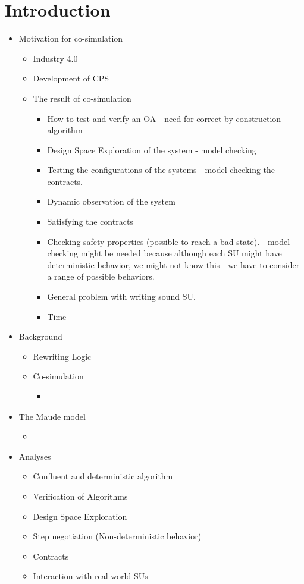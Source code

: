 \section{Introduction}\label{sc:introduction}
\begin{itemize}
    \item Motivation for co-simulation
    \begin{itemize}
      \item Industry 4.0
      \item Development of CPS
      \item The result of co-simulation
      \begin{itemize}
      \item How to test and verify an OA - need for correct by construction algorithm
      \item Design Space Exploration of the system - model checking 
      \item Testing the configurations of the systems - model checking the contracts.
      \item Dynamic observation of the system
      \item Satisfying the contracts
      \item Checking safety properties (possible to reach a bad state). - model checking might be needed because although each SU might have deterministic behavior, we might not know this - we have to consider a range of possible behaviors.
      \item General problem with writing sound SU.
      \item Time 
    \end{itemize}
    \end{itemize}
    \item Background
    \begin{itemize}
      \item Rewriting Logic
      \item Co-simulation
      \begin{itemize}
        \item 
      \end{itemize}
    \end{itemize}
    \item The Maude model
    \begin{itemize}
      \item 
    \end{itemize}
    \item Analyses
    \begin{itemize}
      \item Confluent and deterministic algorithm
      \item Verification of Algorithms
      \item Design Space Exploration
      \item Step negotiation (Non-deterministic behavior)
      \item Contracts
      \item Interaction with real-world SUs
    \end{itemize}
  \end{itemize}
  
